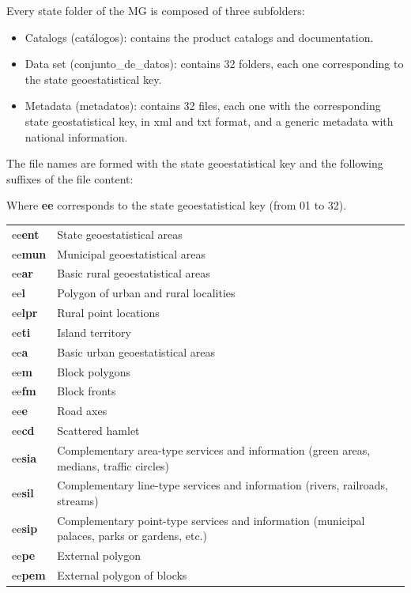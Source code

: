 Every state folder of the MG is composed of three subfolders:
\begin{itemize}
\item Catalogs (catálogos): contains the product catalogs and documentation.
\item Data set (conjunto\_de\_datos): contains 32 folders, each one corresponding to the state geoestatistical key.
\item Metadata (metadatos): contains 32 files, each one with the corresponding state geostatistical key, in xml and txt format, and a generic metadata with national information.
\end{itemize}

The file names are formed with the state geoestatistical key and the following suffixes of the file content:

Where \textbf{ee} corresponds to the state geoestatistical key (from 01 to 32).

\begin{table}[htpb]
  \centering
  \label{tab:MG_filenames}
  \footnotesize
  \begin{tabular}{ l l }
    ee\textbf{ent} & State geoestatistical areas \\
    ee\textbf{mun} & Municipal geoestatistical areas \\
    ee\textbf{ar} & Basic rural geoestatistical areas \\
    ee\textbf{l} & Polygon of urban and rural localities \\
    ee\textbf{lpr} & Rural point locations \\
    ee\textbf{ti} & Island territory\\
    ee\textbf{a} & Basic urban geoestatistical areas \\
    ee\textbf{m} & Block polygons\\
    ee\textbf{fm} & Block fronts \\
    ee\textbf{e} & Road axes \\
    ee\textbf{cd} & Scattered hamlet \\
    ee\textbf{sia} & Complementary area-type services and information (green areas, medians, traffic circles) \\
    ee\textbf{sil} & Complementary line-type services and information
                     (rivers, railroads, streams) \\
    ee\textbf{sip} & Complementary point-type services and information
                     (municipal palaces, parks or gardens, etc.) \\
    ee\textbf{pe} & External polygon \\
    ee\textbf{pem} & External polygon of blocks \\
  \end{tabular}
\end{table}

